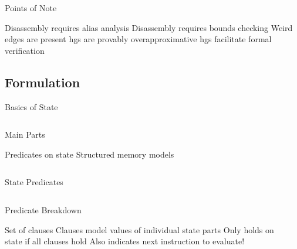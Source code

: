 \begin{frame}{Points of Note}
  \begin{outline}
    \1 Disassembly requires alias analysis
    \1 Disassembly requires bounds checking
    \1 Weird edges are present
    \1 \Glspl{hg} are provably overapproximative
    \1 \Glspl{hg} facilitate formal verification
  \end{outline}
\end{frame}

\subsection{Formulation}

\begin{frame}{Basics of State}
  \begin{columns}
    \begin{block}{Main Parts}
      \begin{outline}[enumerate]
        \1 \alert{Predicates} on state
        \1 Structured \alert{memory models}
      \end{outline}
    \end{block}

  \end{columns}
\end{frame}

\begin{frame}{State Predicates}
  \begin{columns}
    \begin{block}{Predicate Breakdown}
      \begin{outline}
        \1 Set of \alert{clauses}
        \1 Clauses model values of individual \alert{state parts}
        \1 Only holds on state if all clauses hold
        \1 Also indicates next instruction to evaluate!
      \end{outline}
    \end{block}

    \begin{example}[Predicate]
    \end{example}
  \end{columns}
\end{frame}

